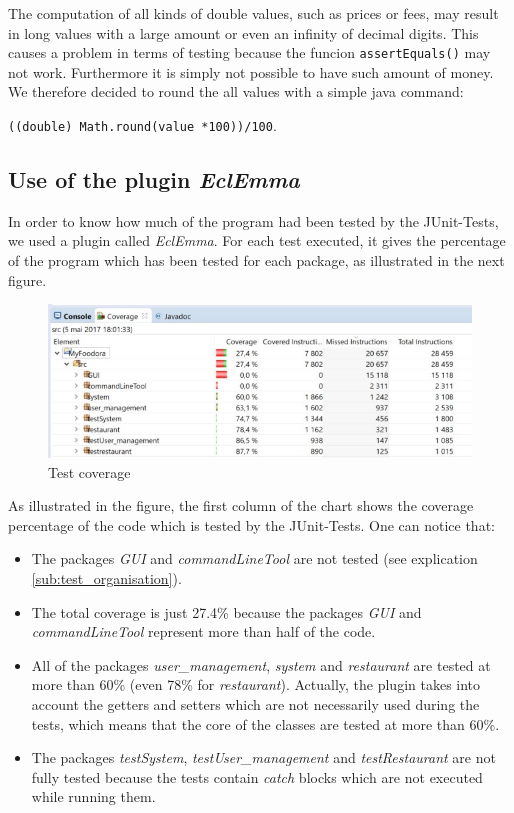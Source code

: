 The computation of all kinds of double values, such as prices or fees, may result in long 
values with a large amount or even an infinity of decimal digits. This causes a problem in 
terms of testing because the funcion \lstinline|assertEquals()| may not work. Furthermore 
it is simply not possible to have such amount of money. We therefore decided to round the 
all values with a simple java command:

\lstinline|((double) Math.round(value *100))/100|.

\subsection{Use of the plugin \textit{EclEmma}}
\label{sub:use_of_the_plugin_EclEmma}

In order to know how much of the program had been tested by the JUnit-Tests, we used a plugin called \textit{EclEmma}. For each test executed, it gives the percentage of the program which has been tested for each package, as illustrated in the next figure. 
\begin{figure}[H]
	\centering
	\includegraphics[width=1\linewidth]{./ima/testcoverage.jpg}
	\caption{Test coverage}
	\label{fig:test-coverage}
\end{figure}
As illustrated in the figure, the first column of the chart shows the coverage percentage of the code which is tested by the JUnit-Tests. One can notice that:
\begin{itemize}
	\item{} The packages \textit{GUI} and \textit{commandLineTool} are not tested (see explication \ref{sub:test_organisation}).
	\item{} The total coverage is just 27.4\% because the packages \textit{GUI} and \textit{commandLineTool}  represent more than half of the code.
	\item{} All of the packages \textit{user\_management}, \textit{system} and \textit{restaurant} are tested at more than 60\% (even 78\% for \textit{restaurant}). Actually, the plugin takes into account the getters and setters which are not necessarily used during the tests, which means that the core of the classes are tested at more than 60\%.
	\item{} The packages \textit{testSystem}, \textit{testUser\_management} and \textit{testRestaurant} are not fully tested because the tests contain \textit{catch} blocks which are not executed while running them.
\end{itemize}
